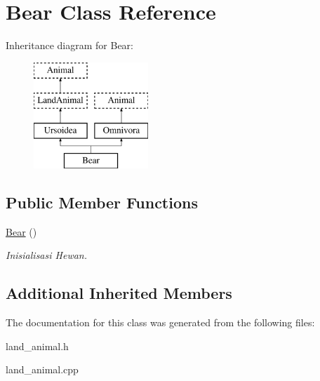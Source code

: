 \hypertarget{class_bear}{}\section{Bear Class Reference}
\label{class_bear}
Inheritance diagram for Bear\+:\begin{figure}[H]
\begin{center}
\leavevmode
\includegraphics[height=4.000000cm]{class_bear}
\end{center}
\end{figure}
\subsection*{Public Member Functions}
\begin{DoxyCompactItemize}
\item 
\hyperlink{class_bear_a639d2d41ec84454055f7b44f23c39639}{Bear} ()\hypertarget{class_bear_a639d2d41ec84454055f7b44f23c39639}{}\label{class_bear_a639d2d41ec84454055f7b44f23c39639}

\begin{DoxyCompactList}\small\item\em Inisialisasi Hewan. \end{DoxyCompactList}\end{DoxyCompactItemize}
\subsection*{Additional Inherited Members}


The documentation for this class was generated from the following files\+:\begin{DoxyCompactItemize}
\item 
land\+\_\+animal.\+h\item 
land\+\_\+animal.\+cpp\end{DoxyCompactItemize}
